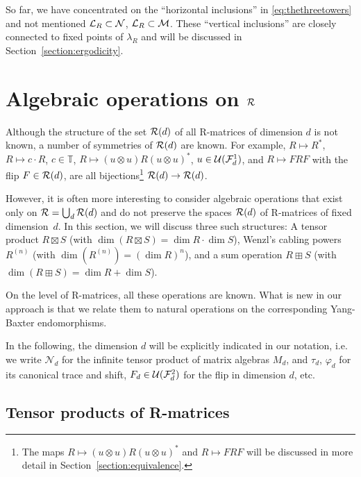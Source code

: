 \documentclass[12pt,a4paper]{amsart}
\numberwithin{equation}{section}
\theoremstyle{remark}
\def\dim{\operatorname{dim}}
\newcommand{\ot}{\otimes}
\def\T{\mathbb{T}}
\newcommand{\la}{\lambda}
\newcommand{\CM}[0]{\mathcal{M}} \newcommand{\CN}[0]{\mathcal{N}}
\newcommand{\CU}[0]{\mathcal{U}} \newcommand{\CV}[0]{\mathcal{V}}
\begin{document}
    \medskip

So far, we have concentrated on the ``horizontal inclusions'' in \eqref{eq:thethreetowers} and not mentioned $\CL_R\subset\CN$, $\CL_R\subset\CM$. These ``vertical inclusions'' are closely connected to fixed points of $\la_R$ and will be discussed in Section~\ref{section:ergodicity}.


\section{Algebraic operations on $\mathcal{R}$}\label{section:operations}

Although the structure of the set $\mathcal{R}(d)$ of all R-matrices of dimension $d$ is not known, a number of symmetries of $\mathcal{R}(d)$ are known. For example, $R\mapsto R^*$, $R\mapsto c\cdot R$, $c\in\T$, $R\mapsto(u\ot u)R(u\ot u)^*$, $u\in\CU(\CF_d^1)$, and $R\mapsto FRF$ with the flip $F\in\mathcal{R}(d)$, are all bijections\footnote{The maps $R\mapsto(u\ot u)R(u\ot u)^*$ and $R\mapsto FRF$ will be discussed in more detail in Section~\ref{section:equivalence}.} $\mathcal{R}(d)\to\mathcal{R}(d)$.

However, it is often more interesting to consider algebraic operations that exist only on $\mathcal{R}=\bigcup_{d}\mathcal{R}(d)$ and do not preserve the spaces $\mathcal{R}(d)$ of R-matrices of fixed dimension~$d$. In this section, we will discuss three such structures: A tensor product $R\boxtimes S$ (with $\dim(R\boxtimes S)=\dim R\cdot\dim S$), Wenzl's cabling powers $R^{(n)}$ (with $\dim(R^{(n)})=(\dim R)^n$), and a sum operation $R\boxplus S$ (with $\dim(R\boxplus S)=\dim R+\dim S$). 

On the level of R-matrices, all these operations are known. What is new in our approach is that we relate them to natural operations on the corresponding Yang-Baxter endomorphisms.

In the following, the dimension $d$ will be explicitly indicated in our notation, i.e.
we write $\CN_d$ for the infinite tensor product of matrix algebras $M_d$, and $\tau_d$, $\varphi_d$ for its canonical trace and shift, $F_d\in\CU(\CF_d^2)$ for the flip in dimension $d$, etc.



\subsection{Tensor products of R-matrices}\label{section:tensorproducts}
\end{document}

